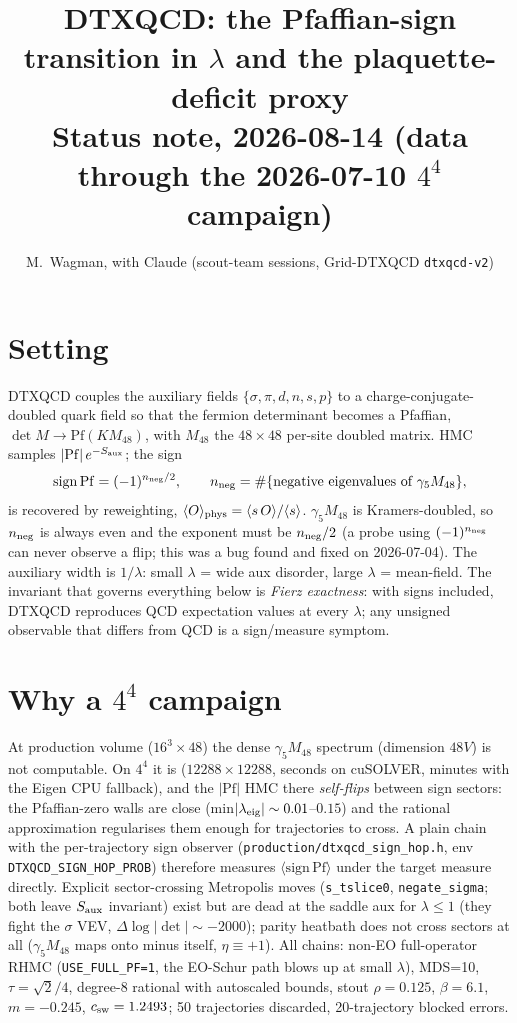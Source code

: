\documentclass[11pt]{article}
\title{DTXQCD: the Pfaffian-sign transition in $\lambda$ and the plaquette-deficit proxy\\
\large Status note, 2026-08-14 (data through the 2026-07-10 $4^4$ campaign)}
\author{M.~Wagman, with Claude (scout-team sessions, Grid-DTXQCD \texttt{dtxqcd-v2})}
\date{}
\begin{document}
\maketitle

\section{Setting}
DTXQCD couples the auxiliary fields $\{\sigma,\pi,d,n,s,p\}$ to a charge-conjugate-doubled
quark field so that the fermion determinant becomes a Pfaffian, $\det M\to\mathrm{Pf}(K M_{48})$,
with $M_{48}$ the $48\times48$ per-site doubled matrix.  HMC samples
$|\mathrm{Pf}|\,e^{-S_{\rm aux}}$; the sign
\begin{equation}
  \mathrm{sign\,Pf} = (-1)^{n_{\rm neg}/2},\qquad
  n_{\rm neg}=\#\{\text{negative eigenvalues of }\gamma_5 M_{48}\},
\end{equation}
is recovered by reweighting, $\langle O\rangle_{\rm phys}=\langle s\,O\rangle/\langle s\rangle$.
$\gamma_5 M_{48}$ is Kramers-doubled, so $n_{\rm neg}$ is always even and the exponent must be
$n_{\rm neg}/2$ (a probe using $(-1)^{n_{\rm neg}}$ can never observe a flip; this was a bug
found and fixed on 2026-07-04).  The auxiliary width is $1/\lambda$: small $\lambda$ = wide aux
disorder, large $\lambda$ = mean-field.  The invariant that governs everything below is
\emph{Fierz exactness}: with signs included, DTXQCD reproduces QCD expectation values at every
$\lambda$; any unsigned observable that differs from QCD is a sign/measure symptom.

\section{Why a $4^4$ campaign}
At production volume ($16^3\times48$) the dense $\gamma_5M_{48}$ spectrum (dimension $48V$) is
not computable.  On $4^4$ it is ($12288\times12288$, seconds on cuSOLVER, minutes with the Eigen
CPU fallback), and the $|\mathrm{Pf}|$ HMC there \emph{self-flips} between sign sectors: the
Pfaffian-zero walls are close (min$|\lambda_{\rm eig}|\sim0.01$--$0.15$) and the rational
approximation regularises them enough for trajectories to cross.  A plain chain with the
per-trajectory sign observer (\texttt{production/dtxqcd\_sign\_hop.h}, env
\texttt{DTXQCD\_SIGN\_HOP\_PROB}) therefore measures $\langle \mathrm{sign\,Pf}\rangle$ under
the target measure directly.  Explicit sector-crossing Metropolis moves (\texttt{s\_tslice0},
\texttt{negate\_sigma}; both leave $S_{\rm aux}$ invariant) exist but are dead at the saddle
aux for $\lambda\le1$ (they fight the $\sigma$ VEV, $\Delta\log|\det|\sim-2000$); parity
heatbath does not cross sectors at all ($\gamma_5M_{48}$ maps onto minus itself, $\eta\equiv+1$).
All chains: non-EO full-operator RHMC (\texttt{USE\_FULL\_PF=1}, the EO-Schur path blows up at
small $\lambda$), MDS=10, $\tau=\sqrt2/4$, degree-8 rational with autoscaled bounds,
stout $\rho=0.125$, $\beta=6.1$, $m=-0.245$, $c_{\rm sw}=1.2493$; 50 trajectories discarded,
20-trajectory blocked errors.
\end{document}
